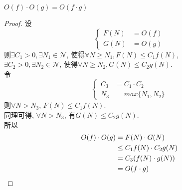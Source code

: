 \documentclass[a4paper]{ctexart}
\begin{document}
\begin{sloppypar}
    \begin{theorem}
        $O(f) \cdot  O(g) = O(f \cdot g)$
    \end{theorem}
    \begin{proof}
        设
        \begin{equation}
            \left\{
            \begin{aligned}
                \nonumber
                F(N) & = O(f) \\
                G(N) & = O(g)
            \end{aligned}
            \right.
        \end{equation}
        则$\exists C_1 > 0, \exists N_1 \in \mathcal{N}$,
        使得$\forall N \geq N_1, F(N) \leq C_1f(N)$,\\
        $\exists C_2 > 0, \exists N_2 \in \mathcal{N}$,
        使得$\forall N \geq N_2, G(N) \leq C_2g(N)$.\\
        令
        \begin{equation}
            \left\{
            \begin{aligned}
                \nonumber
                C_3 & = C_1 \cdot C_2   \\
                N_3 & = max\{N_1, N_2\}
            \end{aligned}
            \right.
        \end{equation}
        则$\forall N > N_3$,
        $F(N) \leq C_1f(N)$.\\
        同理可得, $\forall N > N_3$,
        有$G(N) \leq C_2g(N)$.\\
        所以
        \begin{align*}
            O(f) \cdot O(g) & = F(N) \cdot G(N)          \\
                            & \leq C_1f(N) \cdot C_2g(N) \\
                            & = C_3(f(N) \cdot g(N))     \\
                            & = O(f \cdot g)
            \qedhere
        \end{align*}
        \qedhere
    \end{proof}
    \vspace{1em}


\end{sloppypar}
\end{document}
